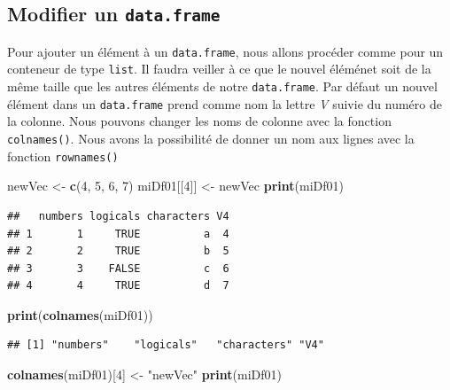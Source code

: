 \documentclass[]{book}
\newenvironment{Shaded}{\begin{snugshade}}{\end{snugshade}}
\newcommand{\DecValTok}[1]{\textcolor[rgb]{0.00,0.00,0.81}{#1}}
\newcommand{\KeywordTok}[1]{\textcolor[rgb]{0.13,0.29,0.53}{\textbf{#1}}}
\newcommand{\NormalTok}[1]{#1}
\newcommand{\StringTok}[1]{\textcolor[rgb]{0.31,0.60,0.02}{#1}}
\begin{document}
\hypertarget{modifier-un-data.frame}{%
\subsection{\texorpdfstring{Modifier un \texttt{data.frame}}{Modifier un data.frame}}\label{modifier-un-data.frame}}

Pour ajouter un élément à un \texttt{data.frame}, nous allons procéder comme pour un conteneur de type \texttt{list}. Il faudra veiller à ce que le nouvel éléménet soit de la même taille que les autres éléments de notre \texttt{data.frame}. Par défaut un nouvel élément dans un \texttt{data.frame} prend comme nom la lettre \emph{V} suivie du numéro de la colonne. Nous pouvons changer les noms de colonne avec la fonction \texttt{colnames()}. Nous avons la possibilité de donner un nom aux lignes avec la fonction \texttt{rownames()}

\begin{Shaded}
\begin{Highlighting}[]
\NormalTok{newVec <-}\StringTok{ }\KeywordTok{c}\NormalTok{(}\DecValTok{4}\NormalTok{, }\DecValTok{5}\NormalTok{, }\DecValTok{6}\NormalTok{, }\DecValTok{7}\NormalTok{)}
\NormalTok{miDf01[[}\DecValTok{4}\NormalTok{]] <-}\StringTok{ }\NormalTok{newVec}
\KeywordTok{print}\NormalTok{(miDf01)}
\end{Highlighting}
\end{Shaded}

\begin{verbatim}
##   numbers logicals characters V4
## 1       1     TRUE          a  4
## 2       2     TRUE          b  5
## 3       3    FALSE          c  6
## 4       4     TRUE          d  7
\end{verbatim}

\begin{Shaded}
\begin{Highlighting}[]
\KeywordTok{print}\NormalTok{(}\KeywordTok{colnames}\NormalTok{(miDf01))}
\end{Highlighting}
\end{Shaded}

\begin{verbatim}
## [1] "numbers"    "logicals"   "characters" "V4"
\end{verbatim}

\begin{Shaded}
\begin{Highlighting}[]
\KeywordTok{colnames}\NormalTok{(miDf01)[}\DecValTok{4}\NormalTok{] <-}\StringTok{ "newVec"}
\KeywordTok{print}\NormalTok{(miDf01)}
\end{Highlighting}
\end{Shaded}
\end{document}
